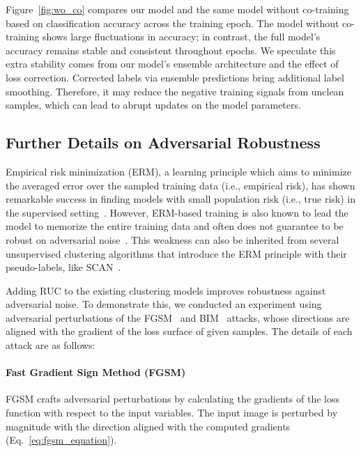 \documentclass[final]{cvpr}
\newcommand{\model}{\textsf{RUC}}
\newcommand{\cutparagraphup}{\vspace*{-0.15in}}
\begin{document}
Figure~\ref{fig:wo_co} compares our model and the same model without co-training based on classification accuracy across the training epoch. The model without co-training shows large fluctuations in accuracy; in contrast, the full model's accuracy remains stable and consistent throughout epochs. We speculate this extra stability comes from our model's ensemble architecture and the effect of loss correction. Corrected labels via ensemble predictions bring additional label smoothing. Therefore, it may reduce the negative training signals from unclean samples, which can lead to abrupt updates on the model parameters.




\subsection{Further Details on Adversarial Robustness}
Empirical risk minimization (ERM), a learning principle which aims to minimize the averaged error over the sampled training data (i.e., empirical risk), has shown remarkable success in finding models with small population risk (i.e., true risk) in the supervised setting~\cite{vapnik2013nature}. However, ERM-based training is also known to lead the model to memorize the entire training data and often does not guarantee to be robust on adversarial noise~\cite{madry2018towards,zhang2017mixup}. This weakness can also be inherited from several unsupervised clustering algorithms that introduce the ERM principle with their pseudo-labels, like SCAN~\cite{van2020scan}.

Adding \model{} to the existing clustering models improves robustness against adversarial noise. To demonstrate this, we conducted an experiment using adversarial perturbations of the FGSM~\cite{goodfellow2014explaining} and BIM~\cite{kurakin2016adversarial} attacks, whose directions are aligned with the gradient of the loss surface of given samples. The details of each attack are as follows:

\cutparagraphup
\paragraph{Fast Gradient Sign Method (FGSM)}
FGSM crafts adversarial perturbations by calculating the gradients of the loss function  with respect to the input variables. The input image is perturbed by magnitude  with the direction aligned with the computed gradients (Eq.~\eqref{eq:fgsm_equation}).


\cutparagraphup
\end{document}
